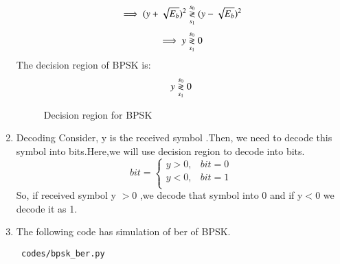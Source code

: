 \begin{enumerate}[label=\thesubsection.\arabic*.,ref=\thesubsection.\theenumi]
\begin{align}
     \implies (y+\sqrt{E_b})^2 \overset{s_0}{\underset{s_1}{\gtrless}} (y - \sqrt{E_b})^2
     \label{eq:ee18btech11042_10}
\end{align}
\begin{align}
    \implies y \overset{s_0}{\underset{s_1}{\gtrless}} 0
    \label{eq:ee18btech11042_11}
\end{align}
The decision region of BPSK is:
\begin{align}
    y \overset{s_0}{\underset{s_1}{\gtrless}} 0
    \label{eq:ee18btech11042_12}
\end{align}
\begin{figure}[!h]
		\resizebox{\columnwidth}{!}{}
\caption{Decision region for BPSK}
\label{fig:ee18btech11042_2}
\end{figure}
\item Decoding 
\newline
Consider, y is the received symbol .Then, we need to decode this symbol into bits.Here,we will  use decision region  to decode into bits.
\[ bit =   \left\{
\begin{array}{cc}

    y>0 ,&     bit = 0 \\
    y<0, &     bit = 1 \\
\end{array}
\right .\]
So, if received symbol y $>$0 ,we decode that symbol into 0  and if y$<$0 we decode it as 1.
\item The following code has simulation of ber of BPSK.
\begin{lstlisting}
 codes/bpsk_ber.py
\end{lstlisting}


\end{enumerate}


